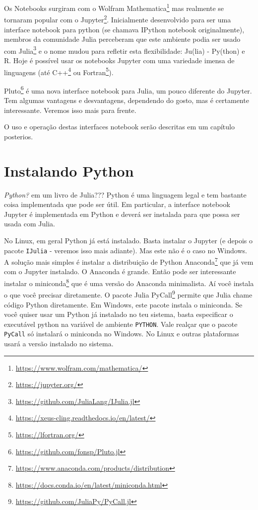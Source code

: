 \documentclass[
  notoc %
]{tufte-book}
\DeclareRobustCommand{\href}[2]{#2\footnote{\url{#1}}}
\newcommand{\passthrough}[1]{#1}
\begin{document}
Os Notebooks surgiram com o
\href{https://www.wolfram.com/mathematica/}{Wolfram Mathematica} mas
realmente se tornaram popular com o
\href{https://jupyter.org/}{Jupyter}. Inicialmente desenvolvido para ser
uma interface notebook para python (se chamava IPython notebook
originalmente), membros da comunidade Julia perceberam que este ambiente
podia ser usado com \href{https://github.com/JuliaLang/IJulia.jl}{Julia}
e o nome mudou para refletir esta flexibilidade: Ju(lia) - Py(thon) e R.
Hoje é possível usar os notebooks Jupyter com uma variedade imensa de
linguagens (até \href{https://xeus-cling.readthedocs.io/en/latest/}{C++}
ou \href{https://lfortran.org/}{Fortran}).

\href{https://github.com/fonsp/Pluto.jl}{Pluto} é uma nova interface
notebook para Julia, um pouco diferente do Jupyter. Tem algumas
vantagens e desvantagens, dependendo do gosto, mas é certamente
interessante. Veremos isso mais para frente.

O uso e operação destas interfaces notebook serão descritas em um
capítulo posterios.

\hypertarget{sec:python}{%
\section{Instalando Python}\label{sec:python}}

\emph{Python?} em um livro de Julia??? Python é uma linguagem legal e
tem bastante coisa implementada que pode ser útil. Em particular, a
interface notebook Jupyter é implementada em Python e deverá ser
instalada para que possa ser usada com Julia.

No Linux, em geral Python já está instalado. Basta instalar o Jupyter (e
depois o pacote \passthrough{\lstinline!IJulia!} - veremos isso mais
adiante). Mas este não é o caso no Windows. A solução mais simples é
instalar a
\href{https://www.anaconda.com/products/distribution}{distribuição de
Python Anaconda} que já vem com o Jupyter instalado. O Anaconda é
grande. Então pode ser interessante instalar o
\href{https://docs.conda.io/en/latest/miniconda.html}{miniconda} que é
uma versão do Anaconda minimalista. Aí você instala o que você precisar
diretamente. \href{https://github.com/JuliaPy/PyCall.jl}{O pacote Julia
PyCall} permite que Julia chame código Python diretamente. Em Windows,
este pacote instala o miniconda. Se você quiser usar um Python já
instalado no teu sistema, basta especificar o executável python na
variável de ambiente \passthrough{\lstinline!PYTHON!}. Vale realçar que
o pacote \passthrough{\lstinline!PyCall!} só instalará o miniconda no
Windows. No Linux e outras plataformas usará a versão instalado no
sistema.
\end{document}
